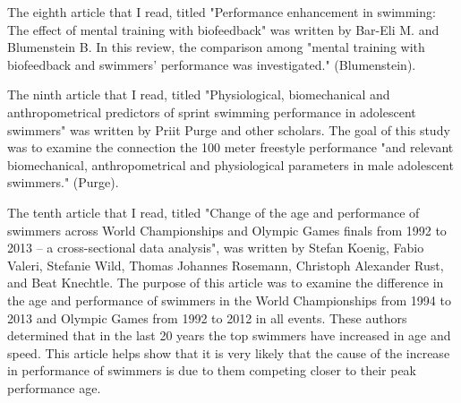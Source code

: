 \documentclass[letterpaper, 10 pt, conference]{ieeeconf}  %
\begin{document}
The eighth article that I read, titled "Performance enhancement in swimming: The effect of mental training with biofeedback" was written by Bar-Eli M. and Blumenstein B. In this review, the comparison among "mental training with biofeedback and swimmers' performance was investigated." (Blumenstein). ~\cite{bar-eli_blumenstein_2004}

The ninth article that I read, titled "Physiological, biomechanical and anthropometrical predictors of sprint swimming performance in adolescent swimmers" was written by Priit Purge and other scholars. The goal of this study was to examine the connection the 100 meter freestyle performance "and relevant biomechanical, anthropometrical and physiological parameters in male adolescent swimmers." (Purge). ~\cite{e_j_p_r_k_kl_fa_t_2010}

The tenth article that I read, titled "Change of the age and performance of swimmers across World Championships and Olympic Games finals from 1992 to 2013 – a cross-sectional data analysis", was written by Stefan Koenig, Fabio Valeri, Stefanie Wild, Thomas Johannes Rosemann, Christoph Alexander Rust, and Beat Knechtle. The purpose of this article was to examine the difference in the age and performance of swimmers in the World Championships from 1994 to 2013 and Olympic Games from 1992 to 2012 in all events. These authors determined that in the last 20 years the top swimmers have increased in age and speed. This article helps show that it is very likely that the cause of the increase in performance of swimmers is due to them competing closer to their peak performance age. ~\cite{könig_valeri_wild_rosemann_rüst_knechtle_2014}
\end{document}

